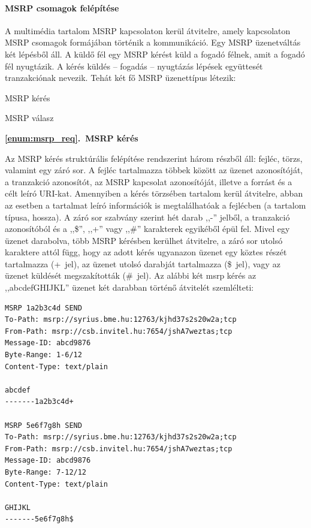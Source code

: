 \paragraph{MSRP csomagok felépítése\\}
\label{sec:msrp_chunks}

A multimédia tartalom MSRP kapcsolaton kerül átvitelre, amely kapcsolaton MSRP csomagok formájában történik a kommunikáció. Egy MSRP üzenetváltás két lépésből áll. A küldő fél egy MSRP kérést küld a fogadó félnek, amit a fogadó fél nyugtázik. A kérés küldés -- fogadás -- nyugtázás lépések együttesét tranzakciónak nevezik. Tehát két fő MSRP üzenettípus létezik:
\begin{myenumerate}
\item \label{enum:msrp_req} MSRP kérés
\item \label{enum:msrp_resp} MSRP válasz
\end{myenumerate}
\bigskip

\noindent
{\bf \ref{enum:msrp_req}.~MSRP kérés}

Az MSRP kérés struktúrális felépítése rendszerint három részből áll: fejléc, törzs, valamint egy záró sor. A fejléc tartalmazza többek között az üzenet azonosítóját, a tranzakció azonosítót, az MSRP kapcsolat azonosítóját, illetve a forrást és a célt leíró URI-kat. Amennyiben a kérés törzsében tartalom kerül átvitelre, abban az esetben a tartalmat leíró információk is megtalálhatóak a fejlécben (a tartalom típusa, hossza). A záró sor szabvány szerint hét darab ,,-'' jelből, a tranzakció azonosítóból és a ,,\$'', ,,+'' vagy ,,\#'' karakterek egyikéből épül fel. Mivel egy üzenet darabolva, több MSRP kérésben kerülhet átvitelre, a záró sor utolsó karaktere attól függ, hogy az adott kérés ugyanazon üzenet egy köztes részét tartalmazza (+~jel), az üzenet utolsó darabját tartalmazza (\$~jel), vagy az üzenet küldését megszakították (\#~jel). Az alábbi két msrp kérés az ,,abcdefGHIJKL'' üzenet két darabban történő átvitelét szemlélteti:

\fontsize{10}{10}
\begin{verbatim}
MSRP 1a2b3c4d SEND
To-Path: msrp://syrius.bme.hu:12763/kjhd37s2s20w2a;tcp
From-Path: msrp://csb.invitel.hu:7654/jshA7weztas;tcp
Message-ID: abcd9876
Byte-Range: 1-6/12
Content-Type: text/plain

abcdef
-------1a2b3c4d+

MSRP 5e6f7g8h SEND
To-Path: msrp://syrius.bme.hu:12763/kjhd37s2s20w2a;tcp
From-Path: msrp://csb.invitel.hu:7654/jshA7weztas;tcp
Message-ID: abcd9876
Byte-Range: 7-12/12
Content-Type: text/plain

GHIJKL
-------5e6f7g8h$
\end{verbatim}
\fontsize{12}{12} 

